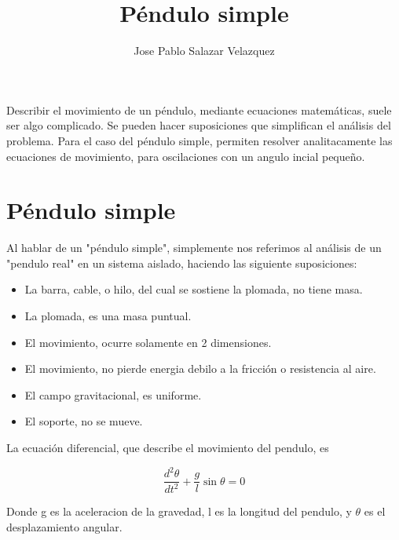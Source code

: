 \documentclass[12pt]{article}
\title{Péndulo simple}
\author{Jose Pablo Salazar Velazquez}
\date{}
\begin{document}
\maketitle
    \begin{justified}
   Describir el movimiento de un péndulo, mediante ecuaciones matemáticas, suele ser algo complicado. Se pueden hacer suposiciones que simplifican el análisis del problema. Para el caso del péndulo simple, permiten resolver analitacamente las ecuaciones de movimiento, para oscilaciones con un angulo incial pequeño.
    \end{justified}
    
    \section{Péndulo simple}
      \begin{justified}
  Al hablar de un "péndulo simple", simplemente nos referimos al análisis de un "pendulo real" en un sistema aislado, haciendo las siguiente suposiciones:
          \begin{itemize}
         \item La barra, cable, o hilo, del cual se sostiene la plomada, no tiene masa.
         \item La plomada, es una masa puntual.
         \item El movimiento, ocurre solamente en 2 dimensiones.
         \item El movimiento, no pierde energia debilo a la fricción o resistencia al aire.
         \item El campo gravitacional, es uniforme.
         \item El soporte, no se mueve.
       \end{itemize}
 La ecuación diferencial, que describe el movimiento del pendulo, es
       \end{justified}
 \begin{equation}
 \frac{d^2\theta}{dt^2} + \frac{g}{l}\sin\theta = 0
 \end{equation}
 
      \begin{justified}
 Donde g es la aceleracion de la gravedad, l es la longitud del pendulo, y $\theta$ es el desplazamiento angular.
     \end{justified}
     
\end{document}
